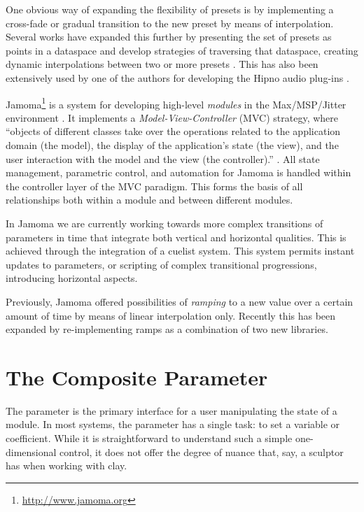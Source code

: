 \documentclass{article}
\begin{document}
One obvious way of expanding the flexibility of presets is by implementing a cross-fade or gradual transition to the new preset by means of interpolation. Several works have expanded this further by presenting the set of presets as points in a dataspace and develop strategies of traversing that dataspace, creating dynamic interpolations between two or more presets \cite{Bencina:2005metasurface, Dahlstedt:2001, Momeni:2003}. This has also been extensively used by one of the authors for developing the Hipno audio plug-ins \cite{Place:2005hipno}.

Jamoma\footnote{\url{http://www.jamoma.org}} is a system for developing high-level \emph{modules} in the Max/MSP/Jitter environment \cite{Place:2006}. It implements a \emph{Model-View-Controller} (MVC) strategy, where ``objects of different classes take over the operations related to the application domain (the model), the display of the application's state (the view), and the user interaction with the model and the view (the controller).'' \cite[p.~26]{Krasner:1988}. All state management, parametric control, and automation for Jamoma is handled within the controller layer of the MVC paradigm. This forms the basis of all relationships both within a module and between different modules.

In Jamoma we are currently working towards more complex transitions of parameters in time that integrate both vertical and horizontal qualities.  This is achieved through the integration of a cuelist system. This system permits instant updates to parameters, or scripting of complex transitional progressions, introducing horizontal aspects. 

Previously, Jamoma offered possibilities of \emph{ramping} to a new value over a certain amount of time by means of linear interpolation only. Recently this has been expanded by re-implementing ramps as a combination of two new libraries.


\section{The Composite Parameter} %
\label{sec:the_composite_parameter}

The parameter is the primary interface for a user manipulating the state of a module. In most systems, the parameter has a single task: to set a variable or coefficient. While it is straightforward to understand such a simple one-dimensional control, it does not offer the degree of nuance that, say, a sculptor has when working with clay.
\end{document}
